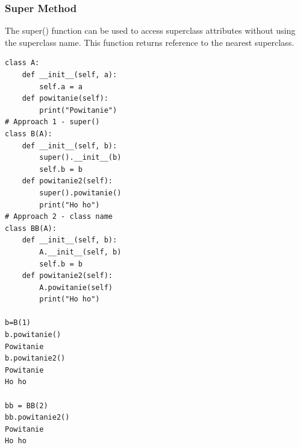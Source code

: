 \documentclass{article}
\begin{document}
\subsubsection{Super Method}
The super() function can be used to access superclass attributes without using the superclass name. This function returns reference to the nearest superclass.
\begin{lstlisting}[style=pystyle]
class A:
    def __init__(self, a):
        self.a = a
    def powitanie(self):
        print("Powitanie")
# Approach 1 - super()
class B(A):
    def __init__(self, b):
        super().__init__(b)
        self.b = b
    def powitanie2(self):
        super().powitanie()
        print("Ho ho")
# Approach 2 - class name
class BB(A):
    def __init__(self, b):
        A.__init__(self, b)
        self.b = b
    def powitanie2(self):
        A.powitanie(self)
        print("Ho ho")

b=B(1)
b.powitanie()
Powitanie
b.powitanie2()
Powitanie
Ho ho

bb = BB(2)
bb.powitanie2()
Powitanie
Ho ho
\end{lstlisting}
\end{document}
